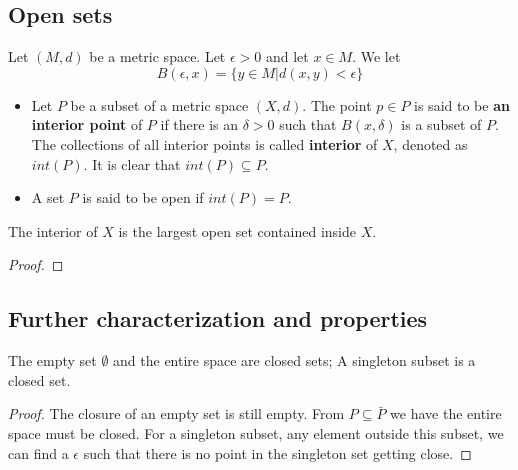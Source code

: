 \begin{refsection}
\subsection{Open sets}
\begin{definition}\cite[132]{johnsonbaugh2010foundations}
Let $(M,d)$ be a metric space. Let $\epsilon > 0$ and let $x\in M$. We let
$$B(\epsilon,x)=\{y\in M| d(x,y) < \epsilon\}$$
\end{definition}

\begin{definition}\cite[24]{luenberger1969optimization}
\begin{itemize}
	\item Let $P$ be a subset of a metric space $(X,d)$. The point $p\in P$ is said to be \textbf{an interior point} of $P$ if there is an $\delta > 0$ such that $B(x,\delta)$ is a subset of $P$. The collections of all interior points is called \textbf{interior} of $X$, denoted as $int(P)$.  It is clear that $int(P) \subseteq P$.
	\item A set $P$ is said to be open if $int(P)=P$.
\end{itemize}	
\end{definition}


\begin{lemma}
The interior of $X$ is the largest open set contained inside $X$.	
\end{lemma}
\begin{proof}

\end{proof}


\subsection{Further characterization and properties}



\begin{lemma}\label{ch:metric-space:th:EmptysetEntireSetSingletonSetAreClosedSet}\cite[130]{johnsonbaugh2010foundations}
	The empty set $\emptyset$ and the entire space are closed sets; A singleton subset is a closed set. 
\end{lemma}
\begin{proof}
	The closure of an empty set is still empty. From $P\subseteq \bar{P}$ we have the entire space must be closed. For a singleton subset, any element outside this subset, we can find a $\epsilon$ such that there is no point in the singleton set getting close.	
\end{proof}


\end{refsection}
